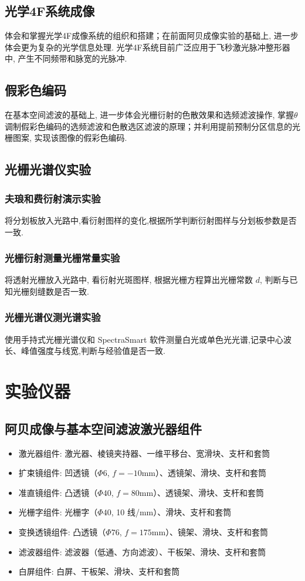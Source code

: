 \documentclass[zihao=5, UTF8]{article}
\theoremstyle{MyLineTheoremStyle} %
\theoremstyle{MyBlockTheoremStyle} %
\theoremstyle{MySubsubsectionStyle} %
\begin{document}
\subsection{光学4F系统成像}
体会和掌握光学4F成像系统的组织和搭建；在前面阿贝成像实验的基础上, 进一步体会更为复杂的光学信息处理. 光学4F系统目前广泛应用于飞秒激光脉冲整形器中, 产生不同频带和脉宽的光脉冲. 

\subsection{假彩色编码}
在基本空间滤波的基础上, 进一步体会光栅衍射的色散效果和选频滤波操作, 掌握$\theta$调制假彩色编码的选频滤波和色散选区滤波的原理；并利用提前预制分区信息的光栅图案, 实现该图像的假彩色编码. 

\subsection{光栅光谱仪实验}
\subsubsection{夫琅和费衍射演示实验}
将分划板放入光路中,看衍射图样的变化,根据所学判断衍射图样与分划板参数是否一致. 
\subsubsection{光栅衍射测量光栅常量实验}
将透射光栅放入光路中, 看衍射光斑图样, 根据光栅方程算出光栅常数 \(d\), 判断与已知光栅刻缝数是否一致. 

\subsubsection{光栅光谱仪测光谱实验}
使用手持式光栅光谱仪和 SpectraSmart 软件测量白光或单色光光谱,记录中心波长、峰值强度与线宽,判断与经验值是否一致. 


\section{实验仪器}

\subsection{阿贝成像与基本空间滤波激光器组件}
\begin{itemize}
    \item 激光器组件: 激光器、棱镜夹持器、一维平移台、宽滑块、支杆和套筒
    \item 扩束镜组件: 凹透镜（$\Phi 6$, $f=-10\text{mm}$）、透镜架、滑块、支杆和套筒
    \item 准直镜组件: 凸透镜（$\Phi 40$, $f=80\text{mm}$）、透镜架、滑块、支杆和套筒
    \item 光栅字组件: 光栅字（$\Phi 40$, 10 线/mm）、滑块、支杆和套筒
    \item 变换透镜组件: 凸透镜（$\Phi 76$, $f=175\text{mm}$）、镜架、滑块、支杆和套筒
    \item 滤波器组件: 滤波器（低通、方向滤波）、干板架、滑块、支杆和套筒
    \item 白屏组件: 白屏、干板架、滑块、支杆和套筒
\end{itemize}
\end{document}
